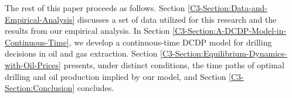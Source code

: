 The rest of this paper proceeds as follows. Section \ref{C3-Section:Data-and-Empirical-Analysis} discusses a set of data utilized for this research and the results from our empirical analysis. In Section \ref{C3-Section:A-DCDP-Model-in-Continuous-Time}, we develop a continuous-time DCDP model for drilling decisions in oil and gas extraction. Section \ref{C3-Section:Equilibrium-Dynamics-with-Oil-Prices} presents, under distinct conditions, the time paths of optimal drilling and oil production implied by our model, and Section \ref{C3-Section:Conclusion} concludes. 
